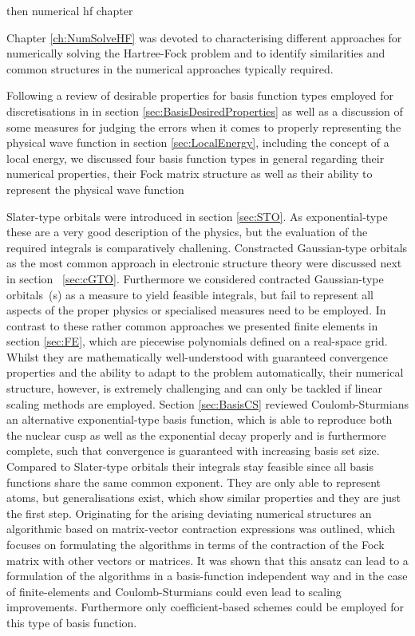 then numerical hf chapter



Chapter \ref{ch:NumSolveHF} was devoted to characterising
different approaches for numerically solving the Hartree-Fock problem
and to identify similarities and common structures
in the numerical approaches typically required.

Following a review of desirable properties
for basis function types employed for discretisations in \HF
in section \vref{sec:BasisDesiredProperties}
as well as a discussion
of some measures for judging the errors when it comes to properly
representing the physical wave function
in section \vref{sec:LocalEnergy},
including the concept of a local energy,
we discussed four basis function types in general
regarding their numerical properties,
their Fock matrix structure
as well as their ability to represent the physical wave function


Slater-type orbitals were introduced in section \vref{sec:STO}.
As exponential-type these are a very good description of the physics,
but the evaluation of the required integrals is comparatively challening.
Constracted Gaussian-type orbitals
as the most common approach in electronic structure theory
were discussed next in section ~\ref{sec:cGTO}.
Furthermore we considered contracted Gaussian-type orbitals~({\cGTO}s)
as a measure to yield feasible integrals,
but fail to represent all aspects of the proper physics
or specialised measures need to be employed.
In contrast to these rather common approaches we presented
finite elements in section \vref{sec:FE},
which are piecewise polynomials defined on a real-space grid.
Whilst they are mathematically well-understood
with guaranteed convergence properties
and the ability to adapt to the problem automatically,
their numerical structure, however, is extremely challenging
and can only be tackled if linear scaling methods are employed.
Section \vref{sec:BasisCS} reviewed Coulomb-Sturmians
an alternative exponential-type basis function,
which is able to reproduce both the nuclear cusp as well as the exponential
decay properly
and is furthermore complete,
such that convergence is guaranteed
with increasing basis set size.
Compared to Slater-type orbitals their integrals stay feasible
since all basis functions share the same common exponent.
They are only able to represent atoms,
but generalisations exist, which show similar properties
and they are just the first step.
Originating for the arising deviating numerical structures
an algorithmic based on matrix-vector contraction expressions
was outlined,
which focuses on formulating the algorithms
in terms of the contraction of the Fock matrix with other
vectors or matrices.
It was shown that this ansatz
can lead to a formulation
of the \SCF algorithms in a basis-function independent way
and in the case of finite-elements and Coulomb-Sturmians
could even lead to scaling improvements.
Furthermore only coefficient-based \SCF schemes could be employed
for this type of basis function.

